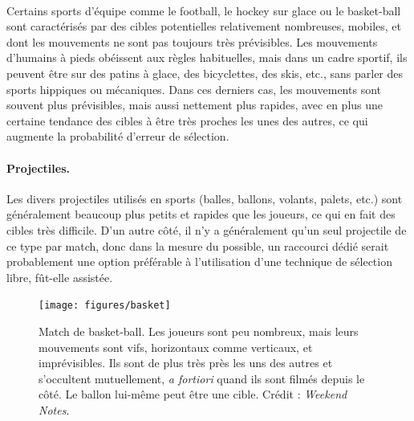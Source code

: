 	\paragraph*{}
	Certains sports d'équipe comme le football, le hockey sur glace ou le basket-ball sont caractérisés par des cibles potentielles relativement nombreuses, mobiles, et dont les mouvements ne sont pas toujours très prévisibles. Les mouvements d'humains à pieds obéissent aux règles habituelles, mais dans un cadre sportif, ils peuvent être sur des patins à glace, des bicyclettes, des skis, etc., sans parler des sports hippiques ou mécaniques. Dans ces derniers cas, les mouvements sont souvent plus prévisibles, mais aussi nettement plus rapides, avec en plus une certaine tendance des cibles à être très proches les unes des autres, ce qui augmente la probabilité d'erreur de sélection.
	
	\paragraph{Projectiles.}
	Les divers projectiles utilisés en sports (balles, ballons, volants, palets, etc.) sont généralement beaucoup plus petits et rapides que les joueurs, ce qui en fait des cibles très difficile. D'un autre côté, il n'y a généralement qu'un seul projectile de ce type par match, donc dans la mesure du possible, un raccourci dédié serait probablement une option préférable à l'utilisation d'une technique de sélection libre, fût-elle assistée.
	
	\begin{figure}[ht]
		\centering
		\texttt{[image: figures/basket]}
		\caption{Match de basket-ball. Les joueurs sont peu nombreux, mais leurs mouvements sont vifs, horizontaux comme verticaux, et imprévisibles. Ils sont de plus très près les uns des autres et s'occultent mutuellement, \emph{a fortiori} quand ils sont filmés depuis le côté. Le ballon lui-même peut être une cible. Crédit : \emph{Weekend Notes}.}
		\label{fig:basketball}
	\end{figure}
	
